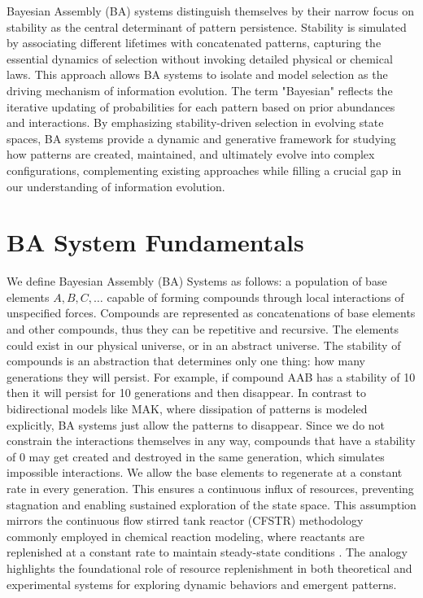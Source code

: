\documentclass[entropy,article,submit,pdftex,moreauthors]{Definitions/mdpi}
\begin{document}
Bayesian Assembly (BA) systems distinguish themselves by their narrow focus on stability as the central determinant of pattern persistence. Stability is simulated by associating different lifetimes with concatenated patterns, capturing the essential dynamics of selection without invoking detailed physical or chemical laws. This approach allows BA systems to isolate and model selection as the driving mechanism of information evolution. The term "Bayesian" reflects the iterative updating of probabilities for each pattern based on prior abundances and interactions. By emphasizing stability-driven selection in evolving state spaces, BA systems provide a dynamic and generative framework for studying how patterns are created, maintained, and ultimately evolve into complex configurations, complementing existing approaches while filling a crucial gap in our understanding of information evolution.

\section{BA System Fundamentals}

We define Bayesian Assembly (BA) Systems as follows: a population of base elements \( A, B, C, \dots \) capable of forming compounds through local interactions of unspecified forces. Compounds are represented as concatenations of base elements and other compounds, thus they can be repetitive and recursive. The elements could exist in our physical universe, or in an abstract universe. The stability of compounds is an abstraction that determines only one thing: how many generations they will persist. For example, if compound AAB has a stability of 10 then it will persist for 10 generations and then disappear. In contrast to bidirectional models like MAK, where dissipation of patterns is modeled explicitly, BA systems just allow the patterns to disappear. Since we do not constrain the interactions themselves in any way, compounds that have a stability of 0 may get created and destroyed in the same generation, which simulates impossible interactions. We allow the base elements to regenerate at a constant rate in every generation. This ensures a continuous influx of resources, preventing stagnation and enabling sustained exploration of the state space. This assumption mirrors the continuous flow stirred tank reactor (CFSTR) methodology commonly employed in chemical reaction modeling, where reactants are replenished at a constant rate to maintain steady-state conditions \cite{fogler1999chemical}. The analogy highlights the foundational role of resource replenishment in both theoretical and experimental systems for exploring dynamic behaviors and emergent patterns.
\end{document}
